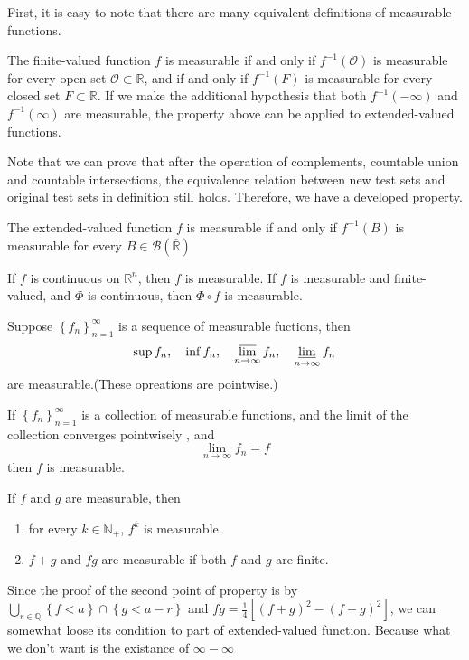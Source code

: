 \documentclass{ctexbook}
\begin{document}
First, it is easy to note that there are many equivalent definitions of measurable functions.
\begin{prop}
    The finite-valued function $f$ is measurable if and only if $f^{-1}(\mathcal{O})$ is measurable for every open set $\mathcal{O} \subset \mathbb{R}$,
    and if and only if $f^{-1}(F)$ is measurable for every closed set $F \subset \mathbb{R}$.
    If we make the additional hypothesis that both $f^{-1}(-\infty)$ and $f^{-1}(\infty)$ are measurable, the property above can be
    applied to extended-valued functions.
\end{prop}
Note that we can prove that after the operation of complements, countable union and countable intersections, the equivalence
relation between new test sets and original test sets in definition still holds. Therefore, we have a developed property.
\begin{prop}
    The extended-valued function $f$ is measurable if and only if $f^{-1}(B)$ is measurable for every $B \in \mathscr{B}(\overline{\mathbb{R}})$
\end{prop}
\begin{prop}
    If $f$ is continuous on $\mathbb{R}^n$, then $f$ is measurable. If $f$ is measurable and finite-valued, and $\Phi$ is continuous,
    then $\Phi \circ f$ is measurable. 
\end{prop}
\begin{prop}
    Suppose $\left\{f_n\right\}_{n=1}^\infty $ is a sequence of measurable fuctions, then 
    \[\sup f_n,\quad \inf f_n,\quad \varlimsup\limits_{n \rightarrow \infty} f_n,\quad \varliminf\limits_{n \rightarrow \infty} f_n\]
    are measurable.(These opreations are pointwise.)
\end{prop}
\begin{prop}
    If $\left\{f_n\right\}_{n=1}^\infty $ is a collection of measurable functions, and the limit of the collection converges pointwisely
    , and\[\lim\limits_{n \rightarrow \infty} f_n = f\]
    then $f$ is measurable.
\end{prop}
\begin{prop}
    \label{prop:add-measurable}
    If $f$ and $g$ are measurable, then
    \begin{enumerate}
        \item for every $k \in \mathbb{N}_+$, $f^k$ is measurable.
        \item $f+g$ and $fg$ are measurable if both $f$ and $g$ are finite.
    \end{enumerate}
\end{prop}
Since the proof of the second point of property is by $\bigcup\limits_{r \in \mathbb{Q}}\left\{f < a\right\}\cap\left\{g < a - r\right\}$
and $fg = \frac{1}{4}[(f+g)^2 - (f-g)^2]$, we can somewhat loose its condition to part of extended-valued function. Because what we
don't want is the existance of $\infty - \infty$ 
\end{document}
